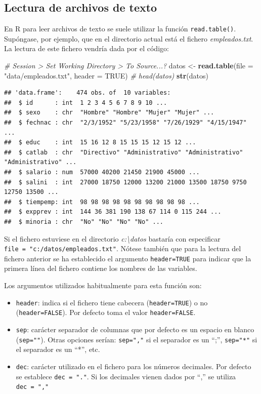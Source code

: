 \documentclass[
]{book}
\newenvironment{Shaded}{\begin{snugshade}}{\end{snugshade}}
\newcommand{\AttributeTok}[1]{\textcolor[rgb]{0.13,0.29,0.53}{#1}}
\newcommand{\CommentTok}[1]{\textcolor[rgb]{0.56,0.35,0.01}{\textit{#1}}}
\newcommand{\ConstantTok}[1]{\textcolor[rgb]{0.56,0.35,0.01}{#1}}
\newcommand{\FunctionTok}[1]{\textcolor[rgb]{0.13,0.29,0.53}{\textbf{#1}}}
\newcommand{\NormalTok}[1]{#1}
\newcommand{\OtherTok}[1]{\textcolor[rgb]{0.56,0.35,0.01}{#1}}
\newcommand{\StringTok}[1]{\textcolor[rgb]{0.31,0.60,0.02}{#1}}
\begin{document}
\subsection{Lectura de archivos de texto}\label{cap2-texto}

En R para leer archivos de texto se suele utilizar la función \texttt{read.table()}.
Supóngase, por ejemplo, que en el directorio actual está el fichero
\emph{empleados.txt}. La lectura de este fichero vendría dada por el código:

\begin{Shaded}
\begin{Highlighting}[]
\CommentTok{\# Session \textgreater{} Set Working Directory \textgreater{} To Source...?}
\NormalTok{datos }\OtherTok{\textless{}{-}} \FunctionTok{read.table}\NormalTok{(}\AttributeTok{file =} \StringTok{"data/empleados.txt"}\NormalTok{, }\AttributeTok{header =} \ConstantTok{TRUE}\NormalTok{)}
\CommentTok{\# head(datos)}
\FunctionTok{str}\NormalTok{(datos)}
\end{Highlighting}
\end{Shaded}

\begin{verbatim}
## 'data.frame':    474 obs. of  10 variables:
##  $ id      : int  1 2 3 4 5 6 7 8 9 10 ...
##  $ sexo    : chr  "Hombre" "Hombre" "Mujer" "Mujer" ...
##  $ fechnac : chr  "2/3/1952" "5/23/1958" "7/26/1929" "4/15/1947" ...
##  $ educ    : int  15 16 12 8 15 15 15 12 15 12 ...
##  $ catlab  : chr  "Directivo" "Administrativo" "Administrativo" "Administrativo" ...
##  $ salario : num  57000 40200 21450 21900 45000 ...
##  $ salini  : int  27000 18750 12000 13200 21000 13500 18750 9750 12750 13500 ...
##  $ tiempemp: int  98 98 98 98 98 98 98 98 98 98 ...
##  $ expprev : int  144 36 381 190 138 67 114 0 115 244 ...
##  $ minoria : chr  "No" "No" "No" "No" ...
\end{verbatim}

Si el fichero estuviese en el directorio \emph{c:\textbackslash datos} bastaría con especificar
\texttt{file\ =\ "c:/datos/empleados.txt"}.
Nótese también que para la lectura del fichero anterior se ha
establecido el argumento \texttt{header=TRUE} para indicar que la primera línea del
fichero contiene los nombres de las variables.

Los argumentos utilizados habitualmente para esta función son:

\begin{itemize}
\item
  \texttt{header}: indica si el fichero tiene cabecera (\texttt{header=TRUE}) o no
  (\texttt{header=FALSE}). Por defecto toma el valor \texttt{header=FALSE}.
\item
  \texttt{sep}: carácter separador de columnas que por defecto es un espacio
  en blanco (\texttt{sep=""}). Otras opciones serían: \texttt{sep=","} si el separador es
  un ``;'', \texttt{sep="*"} si el separador es un ``*'', etc.
\item
  \texttt{dec}: carácter utilizado en el fichero para los números decimales.
  Por defecto se establece \texttt{dec\ =\ "."}. Si los decimales vienen dados
  por ``,'' se utiliza \texttt{dec\ =\ ","}
\end{itemize}
\end{document}
